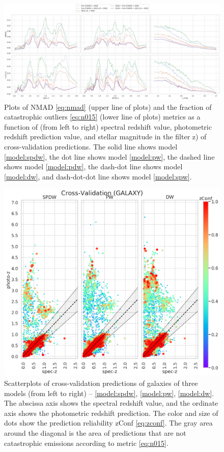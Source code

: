 \documentclass[fleqn,usenatbib]{mnras}
\begin{document}
\begin{figure}
    \centering
    \includegraphics[width=0.99\linewidth]{images/metrics-cv2-ab-mini.png}
    \caption{Plots of NMAD \eqref{eq:nmad} (upper line of plots) and the fraction of catastrophic outliers \eqref{eq:n015} (lower line of plots) metrics as a function of (from left to right) spectral redshift value, photometric redshift prediction value, and stellar magnitude in the filter z) of cross-validation predictions. The solid line shows model \ref{model:spdw}, the dot line shows model \ref{model:pw}, the dashed line shows model \ref{model:pdw}, the dash-dot line shows model \ref{model:dw}, and dash-dot-dot line shows model \ref{model:spw}.}
    \label{fig:metrics-cv2-total}
\end{figure}

\begin{figure}
    \centering
    \includegraphics[width=0.55\linewidth]{images/scatterplots-cv2-gal-sorted.png}
    \caption{Scatterplots of cross-validation predictions of galaxies of three models (from left to right) -- \ref{model:spdw}, \ref{model:pw}, \ref{model:dw}. The abscissa axis shows the spectral redshift value, and the ordinate axis shows the photometric redshift prediction. The color and size of dots show the prediction reliability zConf \eqref{eq:zconf}. The gray area around the diagonal is the area of predictions that are not catastrophic emissions according to metric \eqref{eq:n015}.}
    \label{fig:scatter-cv2-gal}
\end{figure}
\end{document}
